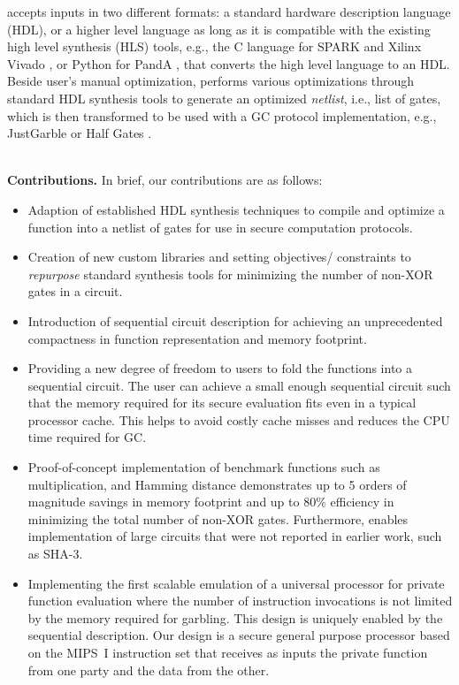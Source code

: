 \sys{} accepts inputs in two different formats: a standard hardware description language (HDL), or a higher level language as long as it is compatible with the existing high level synthesis (HLS) tools, e.g., the C language for  SPARK \cite{Gupta2004} and Xilinx Vivado \cite{tool:Vivado}, or Python for PandA \cite{tool:PandA}, that converts the high level language to an HDL.
Beside user's manual optimization, \sys{} performs various optimizations through standard HDL synthesis tools to generate an optimized \emph{netlist}, i.e., list of gates, which is then transformed to be used with a GC protocol implementation, e.g., JustGarble \cite{bellare2013efficient} or Half Gates \cite{zahur2015two}.

\noindent \\
\textbf{Contributions.} In brief, our contributions are as follows:
\begin{itemize}
\item
  Adaption of established HDL synthesis techniques to compile and optimize a function into a netlist of gates for use in secure computation protocols.

\item
  Creation of new custom libraries and setting objectives/ constraints to \emph{repurpose} standard synthesis tools for minimizing the number of non-XOR gates in a circuit.

\item
  Introduction of sequential circuit description for achieving an unprecedented compactness in function representation and memory footprint.

\item
  Providing a new degree of freedom to users to fold the functions into a sequential circuit.
  The user can achieve a small enough sequential circuit such that the memory required for its secure evaluation fits even in a typical processor cache.
  This helps to avoid costly cache misses and reduces the CPU time required for GC.

\item
  Proof-of-concept implementation of benchmark functions such as multiplication, and Hamming distance demonstrates up to 5 orders of magnitude savings in memory footprint and up to $80\%$ efficiency in minimizing the total number of non-XOR gates.
  Furthermore, \sys{} enables implementation of large circuits that were not reported in earlier work, such as SHA-3.%

\item
  Implementing the first scalable emulation of a universal processor for private function evaluation where the number of instruction invocations is not limited by the memory required for garbling.
  This design is uniquely enabled by the \sys{} sequential description.
  Our design is a secure general purpose processor based on the MIPS~I instruction set that receives as inputs the private function from one party and the data from the other.

\end{itemize}
